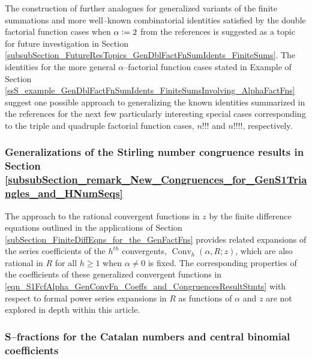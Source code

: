 \documentclass[12pt,reqno]{article}
\numberwithin{sfootnote}{section}
\numberwithin{equation}{section}
\theoremstyle{plain}
\theoremstyle{definition}
\theoremstyle{remark}
\newcommand{\defequals}{\ensuremath{\vcentcolon=}}
\newcommand{\ConvGF}[4]{\ensuremath{\Conv_{#1}\left(#2, #3; #4\right)}}
\DeclareMathOperator{\Conv}{Conv}
\begin{document}
The construction of further 
analogues for generalized variants of the finite summations and 
more well--known combinatorial identities satisfied by the 
double factorial function cases when $\alpha \defequals 2$ from the 
references is suggested as a topic for future investigation in 
Section \ref{subsubSection_FutureResTopics_GenDblFactFnSumIdents_FiniteSums}. 
The identities for the more general $\alpha$--factorial function cases 
stated in 
Example \label{example_GenDblFactFnSumIdents_FiniteSumsInvolving_AlphaFactFns} of 
Section \ref{ssS_example_GenDblFactFnSumIdents_FiniteSumsInvolving_AlphaFactFns} 
suggest one possible approach to generalizing the 
known identities summarized in the references 
\citep{MAA-FUN-WITH-DBLFACT,DBLFACTFN-COMBIDENTS-SURVEY} for the 
next few particularly interesting special cases corresponding to the 
triple and quadruple factorial function cases, $n!!!$ and $n!!!!$, 
respectively. 

\subsubsection{Generalizations of the Stirling number 
               congruence results in 
               Section \ref{subsubSection_remark_New_Congruences_for_GenS1Triangles_and_HNumSeqs}} 
\label{subsubSection_FutureResTopics_GenSNumCongResults} 

     The approach to the rational convergent functions in $z$ by the 
     finite difference equations outlined in the applications of 
     Section \ref{subSection_FiniteDiffEqns_for_the_GenFactFns} 
     provides related expansions of the series coefficients of the 
     $h^{th}$ convergents, $\ConvGF{h}{\alpha}{R}{z}$, which are also 
     rational in $R$ for all $h \geq 1$ when $\alpha \neq 0$ is fixed. 
     The corresponding properties of the coefficients of these 
     generalized convergent functions in 
     \eqref{eqn_S1FcfAlpha_GenConvFn_Coeffs_and_CongruencesResultStmts} 
     with respect to formal power series expansions in $R$ 
     as functions of $\alpha$ and $z$ are not explored in 
     depth within this article. 

\subsubsection{S--fractions for the Catalan numbers and 
               central binomial coefficients} 
\label{subsubSection_footnote_CatalanNumber_S-Fraction_Apps} 
\end{document}
